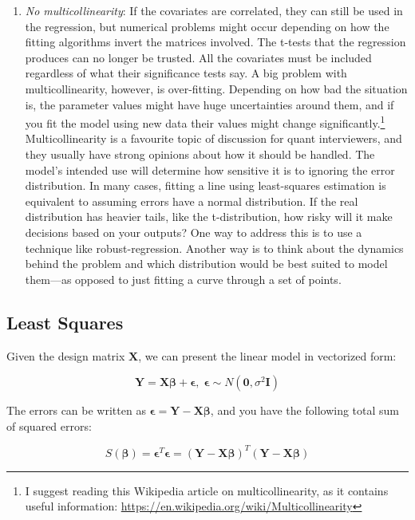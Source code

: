 \documentclass{article}
\begin{document}
\begin{enumerate}
      \item \textit{No multicollinearity}: If the covariates are correlated, they can still be used in the regression, but numerical problems might occur depending on how the fitting algorithms invert the matrices involved. The t-tests that the regression produces can no longer be trusted. All the covariates must be included regardless of what their significance tests say.
      A big problem with multicollinearity, however, is over-fitting.
      Depending on how bad the situation is, the parameter values might have huge uncertainties around them, and if you fit the model using new data their values might change significantly.\footnote{I suggest reading this Wikipedia article on multicollinearity, as it contains useful information: \url{https://en.wikipedia.org/wiki/Multicollinearity}} Multicollinearity is a favourite topic of discussion for quant interviewers, and they usually have strong opinions about how it should be handled. The model's intended use will determine how sensitive it is to ignoring the error distribution. In many cases, fitting a line using least-squares estimation is equivalent to assuming errors have a normal distribution. If the real distribution has heavier tails, like the t-distribution, how risky will it make decisions based on your outputs? One way to address this is to use a technique like robust-regression. Another way is to think about the dynamics behind the problem and which distribution would be best suited to model them---as opposed to just fitting a curve through a set of points.
    \end{enumerate}

  \subsection{Least Squares}

    Given the design matrix $\mathbf{X}$, we can present the linear model in vectorized form: 

    \[\mathbf{Y} = \mathbf{X} \boldsymbol{\beta} + \boldsymbol{\epsilon}, \; \boldsymbol{\epsilon} \sim N(\mathbf{0}, \sigma^2 \mathbf{I})\]

    The errors can be written as $\boldsymbol{\epsilon} = \mathbf{Y} - \mathbf{X} \boldsymbol{\beta}$, and you have the following total sum of squared errors: 

    \[S(\boldsymbol{\beta}) = \boldsymbol{\epsilon}^T \boldsymbol{\epsilon} = (\mathbf{Y} - \mathbf{X} \boldsymbol{\beta})^T (\mathbf{Y} - \mathbf{X} \boldsymbol{\beta})\]
\end{document}
